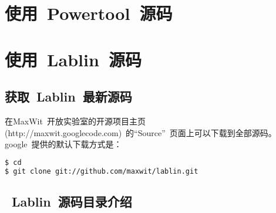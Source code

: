 \documentclass[a4paper,11pt]{article}
\begin{document}
\begin{CJK*}{UTF8}{gbsn}
\section{使用~Powertool~源码}
\section{使用~Lablin~源码}
\subsection{获取~Lablin~最新源码}
在MaxWit~开放实验室的开源项目主页(http://maxwit.googlecode.com)~的``Source''~页面上可以下载到全部源码。google~提供的默认下载方式是： \\
\begin{lstlisting}[language=bash,numbers=none]
$ cd
$ git clone git://github.com/maxwit/lablin.git
\end{lstlisting}

\subsection{~Lablin~源码目录介绍}


\end{CJK*}
\end{document}

